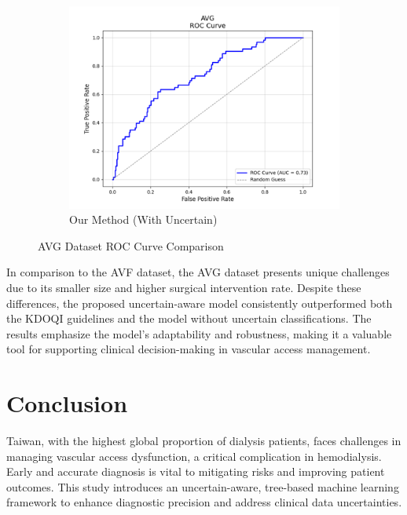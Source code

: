 \documentclass{ieeeaccess}
\begin{document}
\begin{figure}[H]
\begin{subfigure}[b]{0.32\textwidth}
    \end{subfigure}
    \hfill
    \begin{subfigure}[b]{0.32\textwidth}
        \centering
        \includegraphics[width=\linewidth]{AVG_method2_roc.png}
        \caption{Our Method (With Uncertain)}
        \label{fig:pta-symptom-method2-roc}
    \end{subfigure}

    \caption{AVG Dataset ROC Curve Comparison}
    \label{fig:AVG_combined-roc}
\end{figure}

In comparison to the AVF dataset, the AVG dataset presents unique challenges due to its smaller size and higher surgical intervention rate. Despite these differences, the proposed uncertain-aware model consistently outperformed both the KDOQI guidelines and the model without uncertain classifications. The results emphasize the model’s adaptability and robustness, making it a valuable tool for supporting clinical decision-making in vascular access management.

\section{Conclusion}
\label{sec:guidelines}
Taiwan, with the highest global proportion of dialysis patients, faces challenges in managing vascular access dysfunction, a critical complication in hemodialysis. Early and accurate diagnosis is vital to mitigating risks and improving patient outcomes. This study introduces an uncertain-aware, tree-based machine learning framework to enhance diagnostic precision and address clinical data uncertainties.
\end{document}
